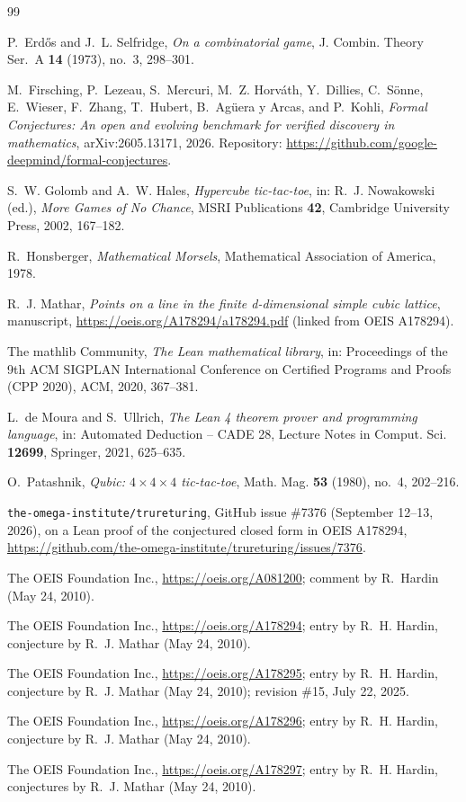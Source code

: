 \documentclass[11pt]{amsart}
\theoremstyle{plain}
\theoremstyle{definition}
\begin{document}
{\footnotesize
\begin{thebibliography}{99}

P.~Erd\H{o}s and J.~L. Selfridge, \emph{On a combinatorial game}, J. Combin. Theory Ser.~A \textbf{14} (1973), no.~3, 298--301.

M.~Firsching, P.~Lezeau, S.~Mercuri, M.~Z. Horv\'ath, Y.~Dillies, C.~S\"onne, E.~Wieser, F.~Zhang, T.~Hubert, B.~Ag\"uera y Arcas, and P.~Kohli, \emph{Formal Conjectures: An open and evolving benchmark for verified discovery in mathematics}, arXiv:2605.13171, 2026. Repository: \url{https://github.com/google-deepmind/formal-conjectures}.

S.~W. Golomb and A.~W. Hales, \emph{Hypercube tic-tac-toe}, in: R.~J. Nowakowski (ed.), \emph{More Games of No Chance}, MSRI Publications \textbf{42}, Cambridge University Press, 2002, 167--182.

R.~Honsberger, \emph{Mathematical Morsels}, Mathematical Association of America, 1978.

R.~J. Mathar, \emph{Points on a line in the finite d-dimensional simple cubic lattice}, manuscript, \url{https://oeis.org/A178294/a178294.pdf} (linked from OEIS A178294).

The mathlib Community, \emph{The Lean mathematical library}, in: Proceedings of the 9th ACM SIGPLAN International Conference on Certified Programs and Proofs (CPP 2020), ACM, 2020, 367--381.

L.~de Moura and S.~Ullrich, \emph{The Lean 4 theorem prover and programming language}, in: Automated Deduction -- CADE 28, Lecture Notes in Comput. Sci. \textbf{12699}, Springer, 2021, 625--635.

O.~Patashnik, \emph{Qubic: $4\times4\times4$ tic-tac-toe}, Math. Mag. \textbf{53} (1980), no.~4, 202--216.

\texttt{the-omega-institute/trureturing}, GitHub issue \#7376 (September 12--13, 2026), on a Lean proof of the conjectured closed form in OEIS A178294, \url{https://github.com/the-omega-institute/trureturing/issues/7376}.

The OEIS Foundation Inc., \url{https://oeis.org/A081200}; comment by R.~Hardin (May 24, 2010).

The OEIS Foundation Inc., \url{https://oeis.org/A178294}; entry by R.~H. Hardin, conjecture by R.~J. Mathar (May 24, 2010).

The OEIS Foundation Inc., \url{https://oeis.org/A178295}; entry by R.~H. Hardin, conjecture by R.~J. Mathar (May 24, 2010); revision \#15, July 22, 2025.

The OEIS Foundation Inc., \url{https://oeis.org/A178296}; entry by R.~H. Hardin, conjecture by R.~J. Mathar (May 24, 2010).

The OEIS Foundation Inc., \url{https://oeis.org/A178297}; entry by R.~H. Hardin, conjectures by R.~J. Mathar (May 24, 2010).

\end{thebibliography}
}
\end{document}
